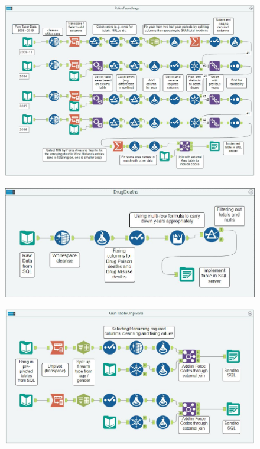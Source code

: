 \documentclass{article}
\begin{document}
\begin{itemize}
\begin{figure}
  	\end{figure}
  	\begin{figure}[h!]
		\centering
		\includegraphics[width=\linewidth]{images/Alteryx_Taser.JPG}
  	\end{figure}
  	\begin{figure}[h!]
  		\centering
		\includegraphics[width=\linewidth]{images/Alteryx_DrugDeaths.JPG}
  	\end{figure}
  	\begin{figure}[h!]
		\centering
		\includegraphics[width=\linewidth]{images/Alteryx_GunTable.JPG}

\end{figure}
\end{itemize}
\end{document}
